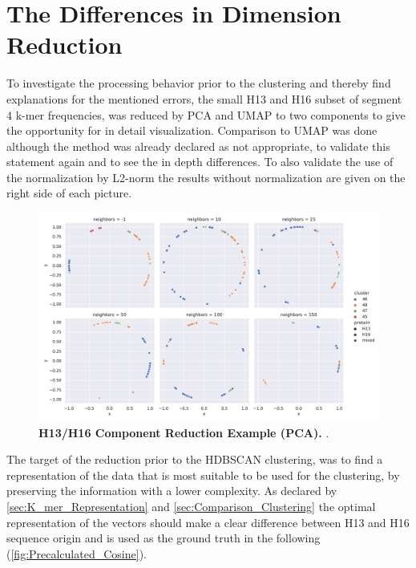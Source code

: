 \section{The Differences in Dimension Reduction} \label{sec:Dimension_Reduction}

To investigate the processing behavior prior to the clustering and thereby find explanations for the mentioned errors, the small H13 and H16 subset of segment 4 k-mer frequencies, was reduced by \gls{PCA} and \gls{UMAP} to two components to give the opportunity for in detail visualization. Comparison to \gls{UMAP} was done although the method was already declared as not appropriate, to validate this statement again and to see the in depth differences. %
To also validate the use of the normalization by L2-norm the results without normalization are given on the right side of each picture.

\begin{figure}[!hbt]
    \centering
    \includegraphics[width=\textwidth]{PCA/Difference_Segment_4_H_metric_cosine.pdf}
    \caption[H13/H16 Component Reduction Example (\Acrshort{PCA})]{\textbf{H13/H16 Component Reduction Example (\Acrshort{PCA}).} .}
    \label{fig:Reduction_Example_PCA}
\end{figure}

The target of the reduction prior to the \gls{HDBSCAN} clustering, was to find a representation of the data that is most suitable to be used for the clustering, by preserving the information with a lower complexity. As declared by \autoref{sec:K_mer_Representation} and \autoref{sec:Comparison_Clustering} the optimal representation of the vectors should make a clear difference between H13 and H16 sequence origin and is used as the ground truth in the following (\autoref{fig:Precalculated_Cosine}). 

